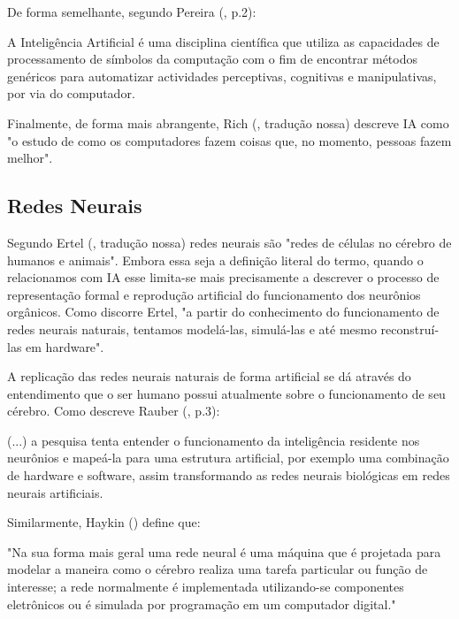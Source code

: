 De forma semelhante, segundo Pereira (\citeyear{pereira88}, p.2):

\begin{citacao}
A Inteligência Artificial é uma disciplina científica que utiliza as capacidades de processamento de símbolos da computação com o fim de encontrar métodos genéricos para automatizar actividades perceptivas, cognitivas e manipulativas, por via do computador.
\end{citacao}


Finalmente, de forma mais abrangente, Rich (\citeyear{rich83}, tradução nossa) descreve IA como "o estudo de como os computadores fazem coisas que, no momento, pessoas fazem melhor".

\subsection {Redes Neurais}
Segundo Ertel (\citeyear{wolf17}, tradução nossa) redes neurais são "redes de células no cérebro de humanos e animais". Embora essa seja a definição literal do termo, quando o relacionamos com IA esse limita-se mais precisamente a descrever o processo de representação formal e reprodução artificial do funcionamento dos neurônios orgânicos. Como discorre Ertel, "a partir do conhecimento do funcionamento de redes neurais naturais, tentamos modelá-las, simulá-las e até mesmo reconstruí-las em hardware".

A replicação das redes neurais naturais de forma artificial se dá através do entendimento que o ser humano possui atualmente sobre o funcionamento de seu cérebro. Como descreve Rauber (\citeyear{rauber20}, p.3):

\begin{citacao}
(...) a pesquisa tenta entender o funcionamento da inteligência residente nos neurônios e mapeá-la para uma estrutura artificial, por exemplo uma combinação de hardware e software, assim transformando as redes neurais biológicas em redes neurais artificiais.
\end{citacao}

Similarmente, Haykin (\citeyear{haykin01}) define que:
\begin{citacao}
"Na sua forma mais geral uma rede neural é uma máquina que é projetada para modelar a maneira como o cérebro realiza uma tarefa particular ou função de interesse; a rede normalmente é implementada utilizando-se componentes eletrônicos ou é simulada por programação em um computador digital."
\end{citacao}

